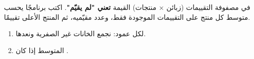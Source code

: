 \begin{statement}
في مصفوفة التقييمات (زبائن × منتجات) القيمة \textbf{ تعني "لم يقيّم"}. اكتب برنامجًا يحسب متوسط كل منتج على التقييمات الموجودة فقط، وعدد مقيّميه، ثم المنتج الأعلى تقييمًا.
\end{statement}
\begin{stepsbox}\begin{enumerate}
\item لكل عمود: نجمع الخانات غير الصفرية ونعدها.
\item المتوسط  إذا كان .
\end{enumerate}\end{stepsbox}

